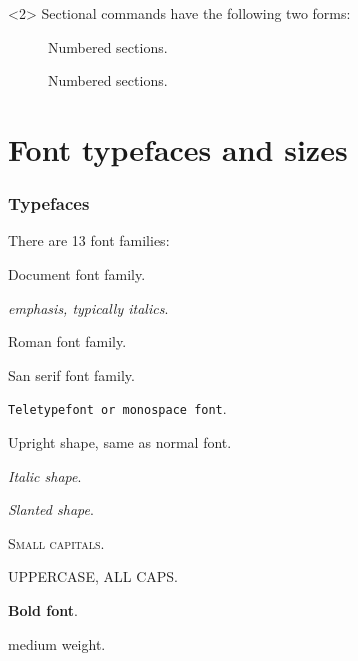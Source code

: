 \documentclass{beamer}
\newcommand{\mysc}[1]{\textrm{\textsc{#1}}}
\newcommand{\mylf}[1]{\textrm{\textlf{#1}}}
\begin{document}
\begin{frame}[fragile]
		\begin{onlyenv}<2>
			Sectional commands have the following two forms:
			\begin{description}
				\item[\texttt{\section{}}] Numbered sections.
				\item[\texttt{\section*{}}] Numbered sections.
			\end{description}
		\end{onlyenv}
	\end{frame}

	\section{Font typefaces and sizes}
	\begin{frame}[t, fragile]
		\frametitle{Typefaces}
			\vfill
			There are 13 font families:
			\vfill
			\begin{description}[align=left, margin=0.5cm]
				\item<+->[\texttt{\textnormal}]  \textnormal{Document font family}.
				\item<+->[\texttt{\emph}] 		\emph{emphasis, typically italics}.
				\item<+->[\texttt{\textrm}] 		\textrm{Roman font family}.
				\item<+->[\texttt{\textsf}] 		\textsf{San serif font family}.
				\item<+->[\texttt{\texttt}] 		\texttt{Teletypefont or monospace font}.
				\item<+->[\texttt{\textup}] 		\textup{Upright shape, same as normal font}.
				\item<+->[\texttt{\textit}] 		\textit{Italic shape}.
				\item<+->[\texttt{\textsl}] 		\textsl{Slanted shape}.
				\item<+->[\texttt{\textsc}] 		\mysc{Small capitals}.
				\item<+->[\texttt{\uppercase}] 	\uppercase{Uppercase, all caps}.
				\item<+->[\texttt{\textbf}] 		\textbf{Bold font}.
				\item<+->[\texttt{\textmd}] 		\textmd{medium weight}.
			\end{description}
			\vfill
	\end{frame}
\end{document}

